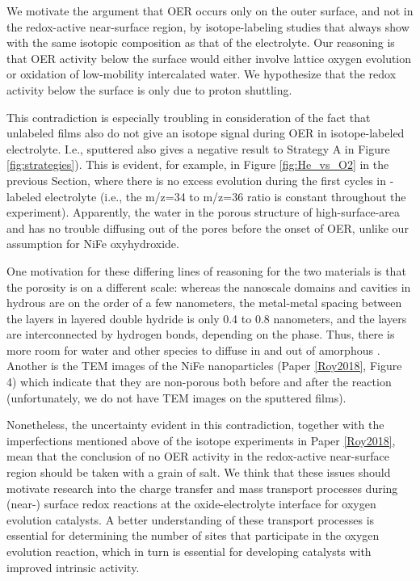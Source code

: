 We motivate the argument that OER occurs only on the outer surface, and not in the redox-active near-surface region, by isotope-labeling studies that always show  with the same isotopic composition as that of the electrolyte. Our reasoning is that OER activity below the surface would either involve lattice oxygen evolution or oxidation of low-mobility intercalated water. We hypothesize that the redox activity below the surface is only due to proton shuttling.

This contradiction is especially troubling in consideration of the fact that unlabeled  films also do not give an isotope signal during OER in isotope-labeled electrolyte. I.e., sputtered  also gives a negative result to Strategy A in Figure \ref{fig:strategies}). This is evident, for example, in Figure \ref{fig:He_vs_O2} in the previous Section, where there is no excess  evolution during the first cycles in -labeled electrolyte (i.e., the m/z=34 to m/z=36 ratio is constant throughout the experiment). Apparently, the water in the porous structure of high-surface-area  and  has no trouble diffusing out of the pores before the onset of OER, unlike our assumption for NiFe oxyhydroxide.

One motivation for these differing lines of reasoning for the two materials is that the porosity is on a different scale: whereas the nanoscale domains and cavities in hydrous  are on the order of a few nanometers\cite{Yoshida2013}, the metal-metal spacing between the layers in  layered double hydride is only 0.4 to 0.8 nanometers, and the layers are interconnected by hydrogen bonds, depending on the phase\cite{Dionigi2016b}. Thus, there is more room for water and other species to diffuse in and out of amorphous . Another is the TEM images of the NiFe nanoparticles (Paper \ref{Roy2018}, Figure 4) which indicate that they are non-porous both before and after the reaction (unfortunately, we do not have TEM images on the sputtered  films).

Nonetheless, the uncertainty evident in this contradiction, together with the imperfections mentioned above of the isotope experiments in Paper \ref{Roy2018}, mean that the conclusion of no OER activity in the redox-active near-surface region should be taken with a grain of salt. We think that these issues should motivate research into the charge transfer and mass transport processes during (near-) surface redox reactions at the oxide-electrolyte interface for oxygen evolution catalysts. A better understanding of these transport processes is essential for determining the number of sites that participate in the oxygen evolution reaction, which in turn is essential for developing catalysts with improved intrinsic activity\cite{Kibsgaard2019}. 

